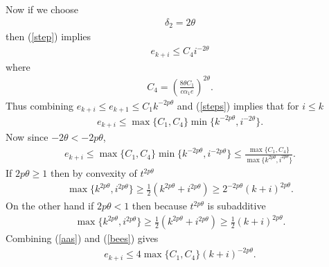 Now if we choose 
\begin{eqnarray}\label{optDelta2}
\delta_2=2\theta
\end{eqnarray}
then (\ref{step}) implies
\begin{eqnarray}\label{steps}
e_{k+i}\leq C_4 i^{-2\theta}
\end{eqnarray}
where
\begin{eqnarray}
C_4 = \left(\frac{8\theta C_1}{c \alpha_1 e}\right)^{2\theta}.  
\end{eqnarray}
Thus combining $e_{k+i}\leq e_{k+1}\leq C_1k^{-2p\theta}$ and (\ref{steps}) implies that for $i\leq k$
\begin{eqnarray*}
e_{k+i}\leq \max\{C_1,C_4\}\min\{k^{-2p\theta},i^{-2\theta}\}.
\end{eqnarray*}
Now since $-2\theta<-2p\theta$,
\begin{eqnarray*}
e_{k+i}\leq \max\{C_1,C_4\}\min\{k^{-2p\theta},i^{-2p\theta}\}\leq \frac{\max\{C_1,C_4\}}{\max\{k^{2p\theta},i^{2p\theta}\}}.
\end{eqnarray*}
If $2p\theta\geq 1$ then by convexity of $t^{2p\theta}$
\begin{eqnarray}
\max\{k^{2p\theta},i^{2p\theta}\}
\geq
\frac{1}{2}
\left(
k^{2p\theta}+i^{2p\theta}
\right)
\geq 
2^{-2p\theta}\left(k+i\right)^{2p\theta}.\label{aas}
\end{eqnarray}
On the other hand if $2p\theta<1$ then because $t^{2p\theta}$ is subadditive
\begin{eqnarray}\label{bees}
\max\{k^{2p\theta},i^{2p\theta}\}
\geq
\frac{1}{2}
\left(
k^{2p\theta}+i^{2p\theta}
\right)
\geq 
\frac{1}{2}\left(k+i\right)^{2p\theta}.
\end{eqnarray}
Combining (\ref{aas}) and (\ref{bees}) gives
\begin{eqnarray}\label{TheFinalCase}
e_{k+i}
\leq
4 \max\{C_1,C_4\}(k+i)^{-2p\theta}.
\end{eqnarray}
\begin{comment}
To conclude the analysis of the $\theta>\frac{1}{2}$ case we note that if $I$ is finite and $k_1$ is the largest element of $I$ and $k_1<k_2$ defined in (\ref{k2Def}), then there exists some $k_3\geq k_1$ such that for $k>k_3$ $e_k\leq 1$. Therefore for $k>k_3$, $e_k^\gamma\geq e_k$ and 
\begin{eqnarray*}
e_{k+1}&\leq& e_k-\alpha_k c e_k^\gamma
\\
&\leq&
e_k(1-\alpha_k c).
\end{eqnarray*}
Without repeating the analysis, this implies that for all $k>k_3$ and $\delta_3>0$
\begin{eqnarray}
e_{k}&\leq& e_{k_3}\exp\left(\frac{-c \alpha_1}{1-d}\left((k+1)^{1-d}-k_2^{1-d}\right)\right)
\nonumber\\
&\leq&
 \delta_3^{\delta_3}e^{-\delta_3}e_{k_3}
 \left(\frac{c \alpha_1}{1-d}\left((k+1)^{1-d}-k_2^{1-d}\right)\right)^{-\delta_3}
 \\
 &\leq&
  \delta_3^{\delta_3}e^{-\delta_3}e_{k_3}
  \left(\frac{c \alpha_1}{1-d}\left((k+1)^{1-d}-k_2^{1-d}\right)\right)^{-\delta_3}
 \label{caseCase}
\end{eqnarray}
Choosing $\delta_3=\frac{2d\theta}{1-d}$ finishes the proof.
\end{comment}
